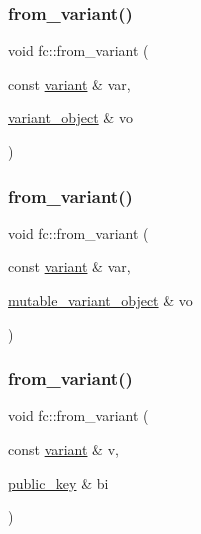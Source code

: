 \mbox{\label{namespacefc_a104f8e7cdb5c4d3ad26743ad03faf4da}} 
\subsubsection{\texorpdfstring{from\+\_\+variant()}{from\_variant()}\hspace{0.1cm}{\footnotesize\ttfamily [4/17]}}
{\footnotesize\ttfamily void fc\+::from\+\_\+variant (\begin{DoxyParamCaption}\item[{const \mbox{\hyperlink{classfc_1_1variant}{variant}} \&}]{var,  }\item[{\mbox{\hyperlink{classfc_1_1variant__object}{variant\+\_\+object}} \&}]{vo }\end{DoxyParamCaption})}

\mbox{\label{namespacefc_adfad35a920f576fa082cf140cdc44b63}} 
\subsubsection{\texorpdfstring{from\+\_\+variant()}{from\_variant()}\hspace{0.1cm}{\footnotesize\ttfamily [5/17]}}
{\footnotesize\ttfamily void fc\+::from\+\_\+variant (\begin{DoxyParamCaption}\item[{const \mbox{\hyperlink{classfc_1_1variant}{variant}} \&}]{var,  }\item[{\mbox{\hyperlink{classfc_1_1mutable__variant__object}{mutable\+\_\+variant\+\_\+object}} \&}]{vo }\end{DoxyParamCaption})}

\mbox{\label{namespacefc_a24f4bac64e6b14a6c3fd1a9bbd714508}} 
\subsubsection{\texorpdfstring{from\+\_\+variant()}{from\_variant()}\hspace{0.1cm}{\footnotesize\ttfamily [6/17]}}
{\footnotesize\ttfamily void fc\+::from\+\_\+variant (\begin{DoxyParamCaption}\item[{const \mbox{\hyperlink{classfc_1_1variant}{variant}} \&}]{v,  }\item[{\mbox{\hyperlink{classfc_1_1public__key}{public\+\_\+key}} \&}]{bi }\end{DoxyParamCaption})}

